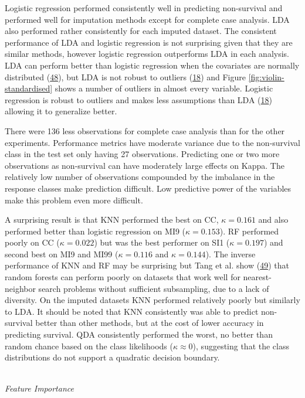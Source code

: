 \documentclass[12pt,]{article}
\begin{document}
Logistic regression performed consistently well in predicting
non-survival and performed well for imputation methods except for
complete case analysis. LDA also performed rather consistently for each
imputed dataset. The consistent performance of LDA and logistic
regression is not surprising given that they are similar methods,
however logistic regression outperforms LDA in each analysis. LDA can
perform better than logistic regression when the covariates are normally
distributed (\protect\hyperlink{ref-efron_efficiency_1975}{48}), but LDA
is not robust to outliers
(\protect\hyperlink{ref-hastie_elements_2009}{18}) and Figure
\ref{fig:violin-standardised} shows a number of outliers in almost every
variable. Logistic regression is robust to outliers and makes less
assumptions than LDA (\protect\hyperlink{ref-hastie_elements_2009}{18})
allowing it to generalize better.

There were 136 less observations for complete case analysis than for the
other experiments. Performance metrics have moderate variance due to the
non-survival class in the test set only having 27 observations.
Predicting one or two more observations as non-survival can have
moderately large effects on Kappa. The relatively low number of
observations compounded by the imbalance in the response classes make
prediction difficult. Low predictive power of the variables make this
problem even more difficult.

A surprising result is that KNN performed the best on CC,
\(\kappa=0.161\) and also performed better than logistic regression on
MI9 (\(\kappa=0.153\)). RF performed poorly on CC (\(\kappa=0.022\)) but
was the best performer on SI1 (\(\kappa=0.197\)) and second best on MI9
and MI99 (\(\kappa=0.116\) and \(\kappa=0.144\)). The inverse
performance of KNN and RF may be surprising but Tang et al. show
(\protect\hyperlink{ref-tang_when_2018}{49}) that random forests can
perform poorly on datasets that work well for nearest-neighbor search
problems without sufficient subsampling, due to a lack of diversity. On
the imputed datasets KNN performed relatively poorly but similarly to
LDA. It should be noted that KNN consistently was able to predict
non-survival better than other methods, but at the cost of lower
accuracy in predicting survival. QDA consistently performed the worst,
no better than random chance based on the class likelihoods
(\(\kappa \approx 0\)), suggesting that the class distributions do not
support a quadratic decision boundary.

\(~\)\\
\emph{Feature Importance}
\end{document}
